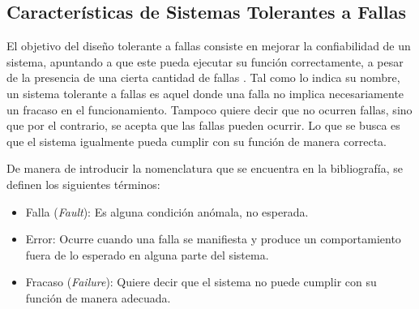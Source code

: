 



\subsection{Características de Sistemas Tolerantes a Fallas}

El objetivo del diseño tolerante a fallas consiste en mejorar la confiabilidad de un sistema, apuntando a que este pueda ejecutar su función correctamente, a pesar de la presencia de una cierta cantidad de fallas \cite{nelson1990fault}. Tal como lo indica su nombre, un sistema tolerante a fallas es aquel donde una falla no implica necesariamente un fracaso en el funcionamiento. Tampoco quiere decir que no ocurren fallas, sino que por el contrario, se acepta que las fallas pueden ocurrir. Lo que se busca es que el sistema igualmente pueda cumplir con su función de manera correcta.



De manera de introducir la nomenclatura que se encuentra en la bibliografía, se definen los siguientes términos:

\begin{itemize}
    \item Falla (\textit{Fault}): Es alguna condición anómala, no esperada.
    \item Error: Ocurre cuando una falla se manifiesta y produce un comportamiento fuera de lo esperado en alguna parte del sistema.
    \item Fracaso (\textit{Failure}): Quiere decir que el sistema no puede cumplir con su función de manera adecuada.
\end{itemize}

